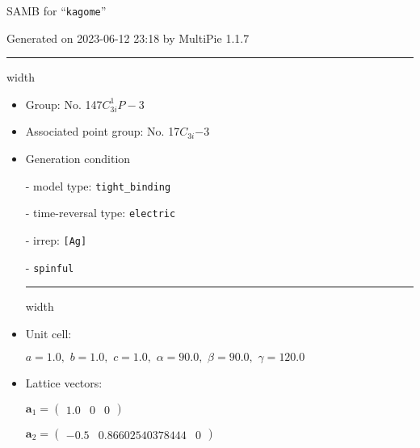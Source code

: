 \documentclass[fleqn,10pt,landscape]{article}
\begin{document}
\setcounter{MaxMatrixCols}{16}

\setlength{\baselineskip}{16pt}
\footnotesize
\begin{center}
\LARGE
SAMB for ``\texttt{kagome}''
\end{center}
\begin{flushright}
Generated on 2023-06-12 23:18 by MultiPie 1.1.7
\end{flushright}
\vspace{1cm}


 \hfil \hrule height 1mm width \textwidth \hfil

\begin{itemize}
\item Group: No. 147\quad$C_{3i}^{1}$\quad$P-3$\quad[ trigonal ]

\item Associated point group: No. 17\quad$C_{3i}$\quad$-3$\quad[ trigonal ]

\vspace{5mm}

\item Generation condition

\quad - model type: \texttt{tight_binding}

\quad - time-reversal type: \texttt{electric}

\quad - irrep: \texttt{[Ag]}

\quad - \texttt{spinful}


 \hfil \hrule height 1mm width \textwidth \hfil

\item Unit cell:

\quad $a=1.0,\,\, b=1.0,\,\, c=1.0,\,\, \alpha=90.0,\,\, \beta=90.0,\,\, \gamma=120.0$

\item Lattice vectors:

\quad $\bm{a}_1=\begin{pmatrix} 1.0 & 0 & 0 \end{pmatrix}$

\quad $\bm{a}_2=\begin{pmatrix} -0.5 & 0.86602540378444 & 0 \end{pmatrix}$


\end{itemize}
\end{document}
